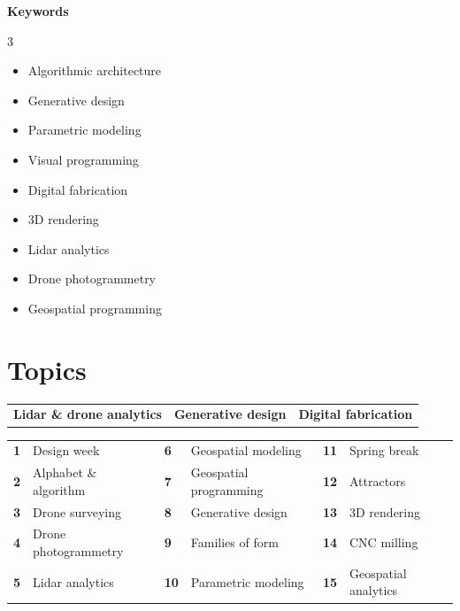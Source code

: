 \documentclass[11pt,article,oneside]{memoir}
\begin{document}
\noindent\textbf{Keywords}
\begin{multicols}{3}
\raggedright
\small
\begin{itemize}
\item Algorithmic architecture
\item Generative design
\item Parametric modeling
\item Visual programming
\item Digital fabrication
\item 3D rendering
\item Lidar analytics
\item Drone photogrammetry
\item Geospatial programming
\end{itemize}
\end{multicols}

\section{Topics}

\begin{table}[H]
\begin{tabular}{l @{\hskip 0.75cm} l @{\hskip 1.9cm} l}
\textbf{Lidar \& drone analytics} & \textbf{Generative design} & \textbf{Digital fabrication}\\
\end{tabular}
\end{table}
%
\vspace*{-1em}
%
\begin{table}[H]
\small
\begin{tabular}{l l l l l l}
\small
\textbf{1} & Design week & \textbf{6} & Geospatial modeling & \textbf{11} & Spring break\\
\textbf{2} & Alphabet \& algorithm & \textbf{7} & Geospatial programming & \textbf{12} & Attractors\\
\textbf{3} & Drone surveying & \textbf{8} & Generative design & \textbf{13} & 3D rendering\\
\textbf{4} & Drone photogrammetry & \textbf{9} & Families of form & \textbf{14} & CNC milling\\
\textbf{5} & Lidar analytics & \textbf{10} & Parametric modeling & \textbf{15} & Geospatial analytics\\
\end{tabular}
\end{table}
\end{document}

